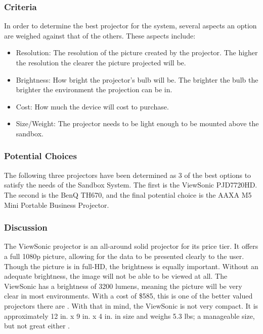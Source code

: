 \subsubsection{Criteria}
In order to determine the best projector for the system, several aspects an option are weighed against that of the others.
These aspects include:
\begin{itemize}
\item Resolution: The resolution of the picture created by the projector.  The higher the resolution the clearer the picture projected will be.
\item Brightness: How bright the projector's bulb will be.  The brighter the bulb the brighter the environment the projection can be in.
\item Cost: How much the device will cost to purchase.
\item Size/Weight: The projector needs to be light enough to be mounted above the sandbox.
\end{itemize}
\subsubsection{Potential Choices}
The following three projectors have been determined as 3 of the best options to satisfy the needs of the Sandbox System.
The first is the ViewSonic PJD7720HD.
The second is the BenQ TH670, and the final potential choice is the AAXA M5 Mini Portable Business Projector.

\subsubsection{Discussion}
The ViewSonic projector is an all-around solid projector for its price tier.  
It offers a full 1080p picture, allowing for the data to be presented clearly to the user.
Though the picture is in full-HD, the brightness is equally important.
Without an adequate brightness, the image will not be able to be viewed at all.
The ViewSonic has a brightness of 3200 lumens, meaning the picture will be very clear in most environments.
With a cost of \$585, this is one of the better valued projectors there are .
With that in mind, the ViewSonic is not very compact.
It is approximately 12 in. x 9 in. x 4 in. in size and weighs 5.3 lbs; a manageable size, but not great either .

